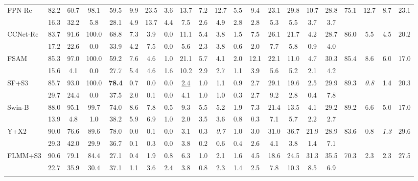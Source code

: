 \documentclass[preprint,12pt]{elsarticle}
\begin{document}
\begin{table}[!htb]
\begin{tabular}{lcccccccccccccccccccc}
\rowcolor{gray!12}
FPN-Re & 82.2 & 60.7 & 98.1 & 59.5 & 9.9 & 23.5 & 3.6 & 13.7 & 7.2 & 12.7 & 5.5 & 9.4 & 23.1 & 29.8 & 10.7 & 28.8 & 75.1 & 12.7 & 8.7 & 23.1 \\
  & 16.3 & 32.2 & 5.8 & 28.1 & 4.9 & 13.7 & 4.4 & 7.5 & 2.6 & 4.9 & 2.8 & 2.8 & 5.3 & 5.5 & 3.7 & 3.7 &  &  &  &  \\ \addlinespace[2pt]
CCNet-Re & 83.7 & 91.6 & 100.0 & 68.8 & 7.3 & 3.9 & 0.0 & 11.1 & 5.4 & 3.8 & 1.5 & 7.5 & 26.1 & 21.7 & 4.2 & 28.7 & 86.0 & 5.5 & 4.5 & 20.2 \\
  & 17.2 & 22.6 & 0.0 & 33.9 & 4.2 & 7.5 & 0.0 & 5.6 & 2.3 & 3.8 & 0.6 & 2.0 & 7.7 & 5.8 & 0.9 & 4.0 &  &  &  &  \\ \addlinespace[2pt]
\rowcolor{gray!12}
FSAM & 85.3 & 97.0 & 100.0 & 59.2 & 7.6 & 4.6 & 1.0 & 21.1 & 5.7 & 4.1 & 2.0 & 12.1 & 22.1 & 11.0 & 4.7 & 30.3 & 85.4 & 8.6 & 6.0 & 17.0 \\
  & 15.6 & 4.1 & 0.0 & 27.7 & 5.4 & 4.6 & 1.6 & 10.2 & 2.9 & 2.7 & 1.1 & 3.9 & 5.6 & 5.2 & 2.1 & 4.2 &  &  &  &  \\ \addlinespace[2pt]
SF+S3 & 85.7 & 93.0 & 100.0 & \textbf{78.4} & 0.7 & 0.0 & 0.0 & \uline{2.4} & 1.0 & 1.1 & 0.9 & 2.7 & 29.1 & 19.6 & 2.5 & 29.9 & 89.3 & \textit{0.8} & 1.4 & 20.3 \\
  & 29.7 & 24.4 & 0.0 & 37.5 & 2.0 & 0.1 & 0.0 & 4.1 & 1.0 & 1.0 & 0.3 & 2.7 & 9.2 & 2.8 & 0.4 & 7.8 &  &  &  &  \\ \addlinespace[2pt]
\rowcolor{gray!12}
Swin-B & 88.0 & 95.1 & 99.7 & 74.0 & 8.6 & 7.8 & 0.5 & 9.3 & 5.5 & 5.2 & 1.9 & 7.3 & 21.4 & 13.5 & 4.1 & 29.2 & 89.2 & 6.6 & 5.0 & 17.0 \\
  & 13.9 & 4.8 & 1.0 & 38.2 & 5.9 & 6.9 & 1.0 & 2.0 & 3.5 & 3.6 & 0.8 & 0.3 & 7.1 & 5.7 & 2.2 & 2.7 &  &  &  &  \\ \addlinespace[2pt]
Y+X2 & 90.0 & 76.6 & 89.6 & 78.0 & 0.0 & 0.1 & 0.0 & 3.1 & 0.3 & \textit{0.7} & 1.0 & 3.0 & 31.0 & 36.7 & 21.9 & 28.9 & 83.6 & 0.8 & \textit{1.3} & 29.6 \\
  & 29.3 & 42.0 & 29.9 & 36.7 & 0.1 & 0.3 & 0.0 & 3.8 & 0.2 & 0.6 & 0.4 & 2.6 & 4.1 & 3.8 & 1.4 & 7.1 &  &  &  &  \\ \addlinespace[2pt]
\rowcolor{gray!12}
FLMM+S3 & 90.6 & 79.1 & 84.4 & 27.1 & 0.4 & 1.9 & 0.8 & 6.3 & 1.0 & 2.1 & 1.6 & 4.5 & 18.6 & 24.5 & 31.3 & 35.5 & 70.3 & 2.3 & 2.3 & 27.5 \\
  & 22.7 & 35.9 & 30.4 & 37.1 & 1.1 & 3.6 & 2.4 & 3.8 & 0.8 & 2.3 & 1.4 & 2.5 & 7.8 & 10.3 & 8.5 & 6.9 &  &  &  &  \\ \addlinespace[2pt]

\end{tabular}
\end{table}
\end{document}
